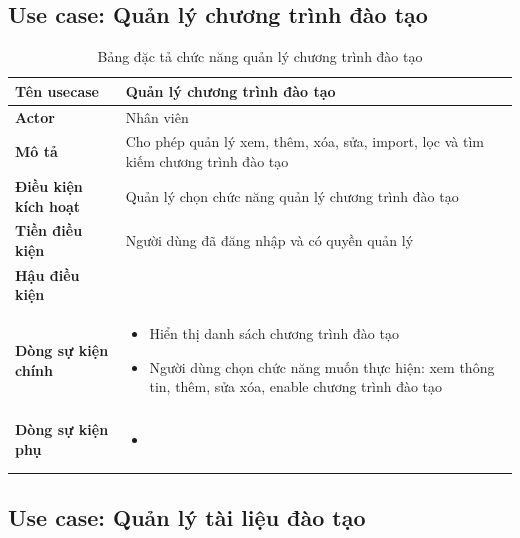 \documentclass[report.tex]{subfiles}
\begin{document}
\FloatBarrier


\subsection{Use case: Quản lý chương trình đào tạo}

\begin{table}[!ht]
\begin{longtable}{|p{4cm}|p{12cm}|}
\hline
\textbf{Tên usecase} & \textbf{Quản lý chương trình đào tạo} \\
\hline
\textbf{Actor} & Nhân viên\\
\hline
\textbf{Mô tả} & Cho phép quản lý xem, thêm, xóa, sửa, import, lọc và tìm kiếm chương trình đào tạo \\
\hline
\textbf{Điều kiện kích hoạt} & Quản lý chọn chức năng quản lý chương trình đào tạo \\
\hline
\textbf{Tiền điều kiện} & Người dùng đã đăng nhập và có quyền quản lý \\
\hline
\textbf{Hậu điều kiện} & \\
\hline
\textbf{Dòng sự kiện chính} &
\begin{itemize}[noitemsep]
  \item Hiển thị danh sách chương trình đào tạo
  \item Người dùng chọn chức năng muốn thực hiện: xem thông tin, thêm, sửa xóa, enable chương trình đào tạo
\end{itemize}\\
\hline
\textbf{Dòng sự kiện phụ} & 
\begin{itemize}[noitemsep]
  \item
\end{itemize}\\
\hline
\caption{Bảng đặc tả chức năng quản lý chương trình đào tạo}
\end{longtable}
\end{table}
\FloatBarrier

\pagebreak
\subsection{Use case: Quản lý tài liệu đào tạo}
\end{document}
